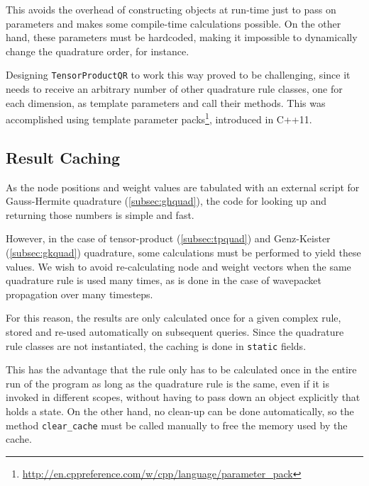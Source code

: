 This avoids the overhead of constructing objects at run-time just to pass on
parameters and makes some compile-time calculations possible.
On the other hand, these parameters must be hardcoded, making it impossible to
dynamically change the quadrature order, for instance.

Designing \texttt{TensorProductQR} to work this way proved to be challenging,
since it needs to receive an arbitrary number of other quadrature rule classes,
one for each dimension, as template parameters and call their methods.
This was accomplished using template parameter
packs\footnote{\url{http://en.cppreference.com/w/cpp/language/parameter_pack}},
introduced in C++11.


\subsection{Result Caching}
\label{subsec:resultcaching}

As the node positions and weight values are tabulated with an external script
for Gauss-Hermite quadrature (\ref{subsec:ghquad}), the code for looking up and
returning those numbers is simple and fast.

However, in the case of tensor-product (\ref{subsec:tpquad}) and Genz-Keister
(\ref{subsec:gkquad}) quadrature, some calculations must be performed to yield
these values.
We wish to avoid re-calculating node and weight vectors when the same quadrature
rule is used many times, as is done in the case of wavepacket propagation over
many timesteps.

For this reason, the results are only calculated once for a given complex
rule, stored and re-used automatically on subsequent queries.
Since the quadrature rule classes are not instantiated, the caching is done in
\texttt{static} fields.

This has the advantage that the rule only has to be calculated once in the
entire run of the program as long as the quadrature rule is the same, even if it
is invoked in different scopes, without having to pass down an object explicitly
that holds a state.
On the other hand, no clean-up can be done automatically, so the method
\texttt{clear\_cache} must be called manually to free the memory used by the
cache.
